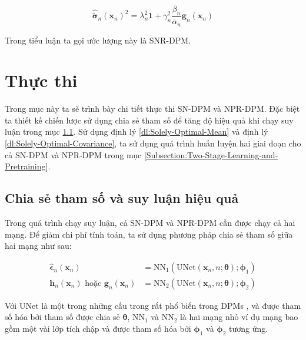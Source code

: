 \documentclass[14pt, a4paper]{article}
\numberwithin{equation}{section}
\numberwithin{figure}{section}
\numberwithin{dl}{section}
\numberwithin{md}{section}
\numberwithin{bd}{section}
\numberwithin{dn}{section}
\numberwithin{hq}{section}
\begin{document}
    \begin{equation} \label{eq:Sigma-NPR-DPM}
        \hat{\tilde{\boldsymbol{\sigma}}}_n (\boldsymbol{x}_n)^2 = \lambda_n^2 \boldsymbol{1} + \gamma_n^2 \dfrac{\overline{\beta}_n}{\overline{\alpha}_n} \boldsymbol{g}_n (\boldsymbol{x}_n)
    \end{equation}

    Trong tiểu luận ta gọi ước lượng này là SNR-DPM.

    \section{Thực thi} \label{Implementation}

    Trong mục này ta sẽ trình bày chi tiết thực thi SN-DPM và NPR-DPM.
    Đặc biệt ta thiết kế chiến lược sử dụng chia sẻ tham số để tăng độ hiệu quả khi chạy suy luận trong mục \ref{Parameter-Sharing-And-Inference-Efficiency}.
    Sử dụng định lý \ref{dl:Solely-Optimal-Mean} và định lý \ref{dl:Solely-Optimal-Covariance}, ta sử dụng quá trình huấn luyện hai giai đoạn cho cả SN-DPM và NPR-DPM trong mục \ref{Subsection:Two-Stage-Learning-and-Pretraining}.

    \subsection{Chia sẻ tham số và suy luận hiệu quả} \label{Parameter-Sharing-And-Inference-Efficiency}

    Trong quá trình chạy suy luận, cả SN-DPM và NPR-DPM cần được chạy cả hai mạng.
    Để giảm chi phí tính toán, ta sử dụng phương pháp chia sẻ tham số giữa hai mạng như sau:

    \begin{equation} \label{eq:Parameter-Sharing-Scheme}
        \begin{aligned}
        \hat{\boldsymbol{\epsilon}}_n (\boldsymbol{x}_n) &= \mathrm{NN}_1 (\mathrm{UNet}(\boldsymbol{x}_n, n ; \boldsymbol{\theta}); \boldsymbol{\phi}_1) \\
        \boldsymbol{h}_n (\boldsymbol{x}_n) \text{ hoặc } \boldsymbol{g}_n (\boldsymbol{x}_n) &= \mathrm{NN}_2(\mathrm{UNet}(\boldsymbol{x}_n, n; \boldsymbol{\theta}); \boldsymbol{\phi}_2)
        \end{aligned}
    \end{equation}

    Với $\mathrm{UNet}$ là một trong những cấu trong rất phổ biến trong DPMs \cite{ho2020denoising}, \cite{song2020score} và được tham số hóa bởi tham số được chia sẻ $\boldsymbol{\theta}$,
    $\mathrm{NN}_1$ và $\mathrm{NN}_2$ là hai mạng nhỏ ví dụ mạng bao gồm một vài lớp tích chập và được tham số hóa bởi $\boldsymbol{\phi}_1$ và $\boldsymbol{\phi}_2$ tương ứng.
\end{document}
